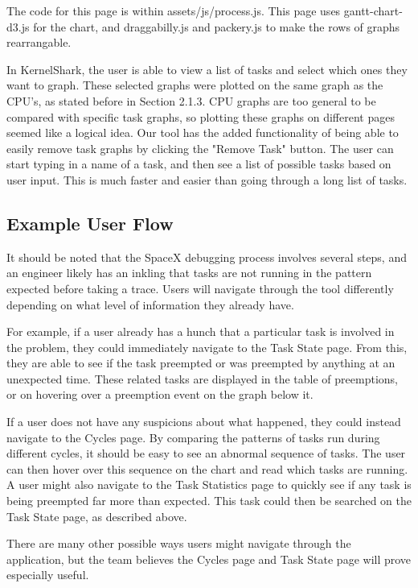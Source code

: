 \documentclass{hmcclinic}
\begin{document}
The code for this page is within assets/js/process.js. This page uses
    gantt-chart-d3.js for the chart, and draggabilly.js and packery.js to make the rows of graphs rearrangable.
    
    In KernelShark, the user is able to view a list of tasks and select which ones they want to graph. These selected graphs were plotted on the same graph as the CPU's, as stated before in Section 2.1.3. CPU graphs are too general to be compared with specific task graphs, so plotting these graphs on different pages seemed like a logical idea. Our tool has the added functionality of being able to easily remove task graphs by clicking the "Remove Task" button. The user can start typing in a name of a task, and then see a list of possible tasks based on user input. This is much faster and easier than going through a long list of tasks.
    
\subsection{Example User Flow}
  It should be noted that the SpaceX debugging process involves several steps,
  and an engineer likely has an inkling that tasks are not running in the
  pattern expected before taking a trace. Users will navigate through the tool
  differently depending on what level of information they already have.

  For example, if a user already has a hunch that a particular task is involved
  in the problem, they could immediately navigate to the Task State page. From
  this, they are able to see if the task preempted or was preempted by anything
  at an unexpected time. These related tasks are displayed in the table of
  preemptions, or on hovering over a preemption event on the graph below it.

  If a user does not have any suspicions about what happened, they could instead
  navigate to the Cycles page. By comparing the patterns of tasks run during
  different cycles, it should be easy to see an abnormal sequence of tasks. The
  user can then hover over this sequence on the chart and read which tasks are
  running. A user might also navigate to the Task Statistics page to quickly see
  if any task is being preempted far more than expected. This task could then be
  searched on the Task State page, as described above.

  There are many other possible ways users might navigate through the
  application, but the team believes the Cycles page and Task State page will
  prove especially useful.
\end{document}
